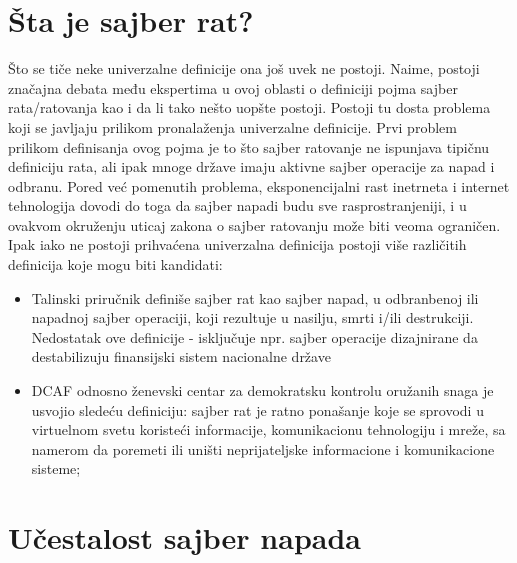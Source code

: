 \documentclass[a4paper]{article}
\begin{document}
{\section{Šta je sajber rat?}
Što se tiče neke univerzalne definicije ona još uvek ne postoji.
Naime, postoji značajna debata među ekspertima u ovoj oblasti o definiciji pojma sajber rata/ratovanja kao i da li tako nešto uopšte postoji. Postoji tu dosta problema koji se javljaju prilikom pronalaženja univerzalne definicije.
Prvi problem prilikom definisanja ovog pojma je to što sajber ratovanje ne ispunjava tipičnu definiciju rata, ali ipak mnoge države imaju aktivne sajber operacije za napad i odbranu. Pored već pomenutih problema, eksponencijalni rast inetrneta i internet tehnologija dovodi do toga da sajber napadi budu sve rasprostranjeniji, i u ovakvom okruženju uticaj zakona o sajber ratovanju može biti veoma ograničen.
Ipak iako ne postoji prihvaćena univerzalna definicija postoji više različitih definicija koje mogu biti kandidati:

\begin{itemize}
\item  Talinski priručnik definiše sajber rat kao sajber napad, u
odbranbenoj ili napadnoj sajber operaciji, koji rezultuje u
nasilju, smrti i/ili destrukciji. Nedostatak ove definicije -
isključuje npr. sajber operacije dizajnirane da destabilizuju
finansijski sistem nacionalne države
\item DCAF odnosno ženevski centar za demokratsku kontrolu oružanih snaga je usvojio sledeću definiciju: sajber rat je ratno ponašanje koje se sprovodi u virtuelnom svetu koristeći informacije, komunikacionu tehnologiju i mreže, sa namerom da poremeti ili uništi neprijateljske informacione i komunikacione sisteme;


\end{itemize} 




\section{Učestalost sajber napada}	
\label{sec:termini_i_citiranje}


}
\end{document}
